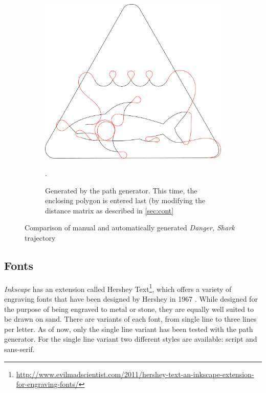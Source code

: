 \begin{figure}[h]
\begin{subfigure}[t]{0.45\textwidth}
\end{subfigure}
\par\bigskip
\begin{subfigure}[t]{0.8\textwidth}
	\includegraphics[width=\textwidth]{images/results/shark/shark_prevent_outer.pdf}
	\caption{Generated by the path generator. This time, the enclosing polygon is entered last (by modifying the distance matrix as described in \autoref{sec:cont}}.
\end{subfigure}

\caption{Comparison of manual and automatically generated \textit{Danger, Shark} trajectory}
\end{figure}

\clearpage
\subsection{Fonts}

\textit{Inkscape} has an extension called Hershey Text\footnote{\url{http://www.evilmadscientist.com/2011/hershey-text-an-inkscape-extension-for-engraving-fonts/}}, which offers a variety of engraving fonts that have been designed by Hershey in 1967 \cite{hershey1967calligraphy}. While designed for the purpose of being engraved to metal or stone, they are equally well suited to be drawn on sand. There are variants of each font, from single line to three lines per letter. As of now, only the single line variant has been tested with the path generator. For the single line variant two different styles are available: script and sans-serif.

